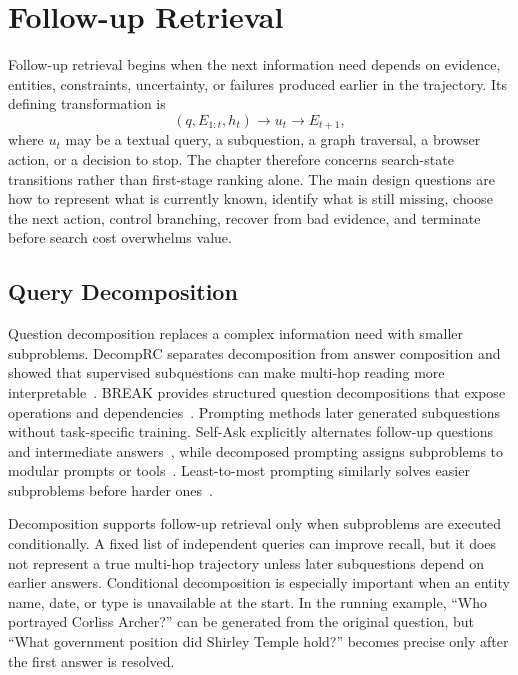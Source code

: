 \section{Follow-up Retrieval}
\label{sec:follow_up_retrieval}

Follow-up retrieval begins when the next information need depends on evidence, entities, constraints, uncertainty, or failures produced earlier in the trajectory. Its defining transformation is
\[
(q,E_{1:t},h_t) \rightarrow u_t \rightarrow E_{t+1},
\]
where $u_t$ may be a textual query, a subquestion, a graph traversal, a browser action, or a decision to stop. The chapter therefore concerns search-state transitions rather than first-stage ranking alone. The main design questions are how to represent what is currently known, identify what is still missing, choose the next action, control branching, recover from bad evidence, and terminate before search cost overwhelms value.

\subsection{Query Decomposition}
\label{subsec:query_decomposition}

Question decomposition replaces a complex information need with smaller subproblems. DecompRC separates decomposition from answer composition and showed that supervised subquestions can make multi-hop reading more interpretable~\cite{min2019decomprc}. BREAK provides structured question decompositions that expose operations and dependencies~\cite{wolfson2020break}. Prompting methods later generated subquestions without task-specific training. Self-Ask explicitly alternates follow-up questions and intermediate answers~\cite{press2022selfask}, while decomposed prompting assigns subproblems to modular prompts or tools~\cite{khot2023decomposed}. Least-to-most prompting similarly solves easier subproblems before harder ones~\cite{zhou2023leasttomost}.

Decomposition supports follow-up retrieval only when subproblems are executed conditionally. A fixed list of independent queries can improve recall, but it does not represent a true multi-hop trajectory unless later subquestions depend on earlier answers. Conditional decomposition is especially important when an entity name, date, or type is unavailable at the start. In the running example, ``Who portrayed Corliss Archer?'' can be generated from the original question, but ``What government position did Shirley Temple hold?'' becomes precise only after the first answer is resolved.

